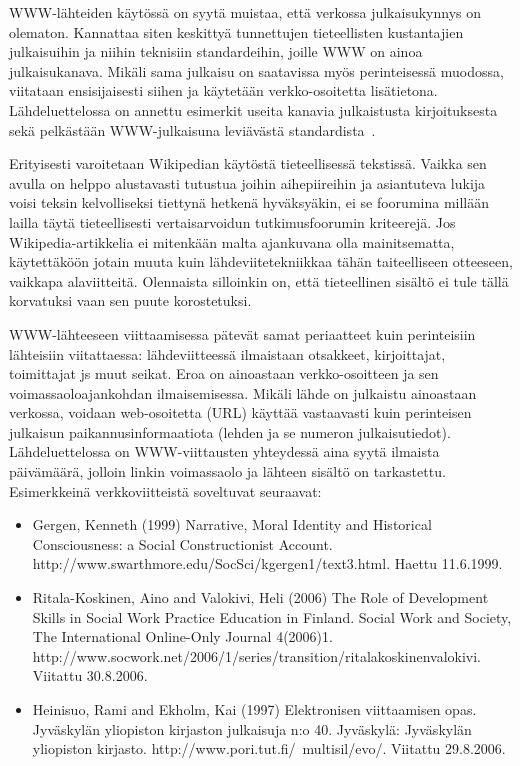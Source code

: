 WWW-lähteiden käytössä on syytä muistaa, että verkossa julkaisukynnys on
olematon. Kannattaa siten keskittyä tunnettujen tieteellisten
kustantajien julkaisuihin ja niihin teknisiin standardeihin, joille WWW
on ainoa julkaisukanava. Mikäli sama julkaisu on saatavissa myös
perinteisessä muodossa, viitataan ensisijaisesti siihen ja käytetään
verkko-osoitetta lisätietona. Lähdeluettelossa on annettu esimerkit
useita kanavia julkaistusta kirjoituksesta~\citep{abiteboul,dietinger} sekä pelkästään
WWW-julkaisuna
leviävästä standardista~\citep{bray}.

Erityisesti varoitetaan Wikipedian käytöstä tieteellisessä tekstissä.
Vaikka sen avulla on helppo alustavasti tutustua joihin aihepiireihin ja
asiantuteva lukija voisi teksin kelvolliseksi tiettynä hetkenä
hyväksyäkin, ei se foorumina millään lailla täytä tieteellisesti
vertaisarvoidun tutkimusfoorumin kriteerejä.
Jos Wikipedia-artikkelia  ei mitenkään malta ajankuvana olla mainitsematta, käytettäköön jotain muuta kuin lähdeviitetekniikkaa tähän taiteelliseen otteeseen, vaikkapa alaviitteitä. Olennaista silloinkin on, että tieteellinen sisältö ei tule tällä korvatuksi vaan sen puute korostetuksi.

WWW-lähteeseen viittaamisessa pätevät samat periaatteet kuin
perinteisiin lähteisiin viitattaessa: lähdeviitteessä ilmaistaan
otsakkeet, kirjoittajat, toimittajat js muut seikat. Eroa on ainoastaan
verkko-osoitteen ja sen voimassaoloajankohdan ilmaisemisessa. Mikäli
lähde on julkaistu ainoastaan verkossa, voidaan web-osoitetta (URL)
käyttää vastaavasti kuin perinteisen julkaisun paikannusinformaatiota
(lehden ja se numeron julkaisutiedot). Lähdeluettelossa on WWW-viittausten yhteydessä aina syytä ilmaista päivämäärä, jolloin linkin voimassaolo ja lähteen sisältö on tarkastettu.
Esimerkkeinä verkkoviitteistä soveltuvat seuraavat:
\begin{itemize}
\item Gergen, Kenneth (1999) Narrative, Moral Identity and Historical
Consciousness: a Social Constructionist Account.
http://www.swarthmore.edu/SocSci/kgergen1/text3.html. Haettu 11.6.1999.
\item 	
Ritala-Koskinen, Aino and Valokivi, Heli (2006) The Role of Development
Skills in Social Work Practice Education in Finland. Social Work and
Society, The International Online-Only Journal 4(2006)1.
http://www.socwork.net/2006/1/series/transition/ritalakoskinenvalokivi.
Viitattu 30.8.2006.
\item Heinisuo, Rami and Ekholm, Kai (1997) Elektronisen viittaamisen
opas. Jyväskylän yliopiston kirjaston julkaisuja n:o 40. Jyväskylä:
Jyväskylän yliopiston kirjasto. http://www.pori.tut.fi/~multisil/evo/.
Viitattu 29.8.2006.
\end{itemize}

